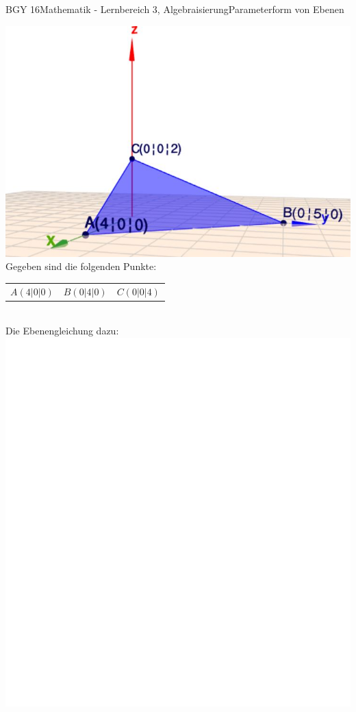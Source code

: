 \documentclass[oneside,openany,headings=optiontotoc,11pt,numbers=noenddot]{scrreprt}
\begin{document}
	\begin{worksheet}{BGY 16}{Mathematik - Lernbereich 3, Algebraisierung}{Parameterform von Ebenen}
		
		\begin{framed}
			\includegraphics[scale=0.95]{Bilder/KoordEbene.jpg}\\
			Gegeben sind die folgenden Punkte:\\
			\begin{tabularx}{\textwidth}{XXX}
				\(A(4|0|0)\)& \(B(0|4|0)\) & \(C(0|0|4)\)\\
			\end{tabularx}\\
		Die Ebenengleichung dazu:\\
		\includegraphics[scale=0.1]{../empty.jpg}\\

\end{framed}
\end{worksheet}
\end{document}
